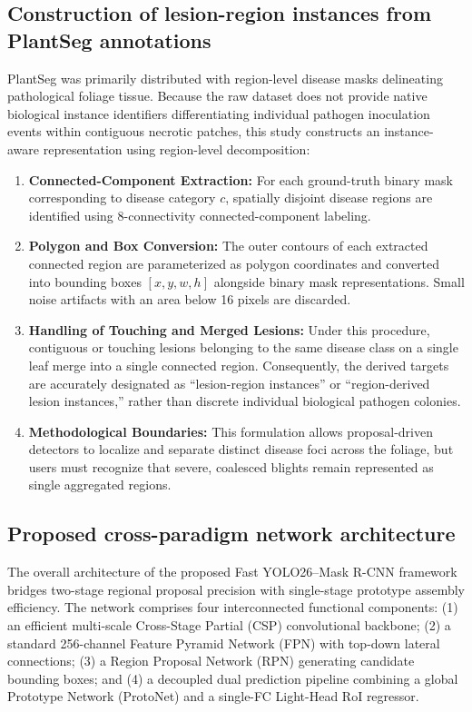 \documentclass[5p,times]{elsarticle}
\begin{document}
\subsection{Construction of lesion-region instances from PlantSeg annotations}
PlantSeg was primarily distributed with region-level disease masks delineating pathological foliage tissue. Because the raw dataset does not provide native biological instance identifiers differentiating individual pathogen inoculation events within contiguous necrotic patches, this study constructs an instance-aware representation using region-level decomposition:
\begin{enumerate}
    \item \textbf{Connected-Component Extraction:} For each ground-truth binary mask corresponding to disease category $c$, spatially disjoint disease regions are identified using 8-connectivity connected-component labeling.
    \item \textbf{Polygon and Box Conversion:} The outer contours of each extracted connected region are parameterized as polygon coordinates and converted into bounding boxes $[x, y, w, h]$ alongside binary mask representations. Small noise artifacts with an area below 16 pixels are discarded.
    \item \textbf{Handling of Touching and Merged Lesions:} Under this procedure, contiguous or touching lesions belonging to the same disease class on a single leaf merge into a single connected region. Consequently, the derived targets are accurately designated as ``lesion-region instances'' or ``region-derived lesion instances,'' rather than discrete individual biological pathogen colonies.
    \item \textbf{Methodological Boundaries:} This formulation allows proposal-driven detectors to localize and separate distinct disease foci across the foliage, but users must recognize that severe, coalesced blights remain represented as single aggregated regions.
\end{enumerate}

\subsection{Proposed cross-paradigm network architecture}
The overall architecture of the proposed Fast YOLO26--Mask R-CNN framework bridges two-stage regional proposal precision with single-stage prototype assembly efficiency. The network comprises four interconnected functional components: (1) an efficient multi-scale Cross-Stage Partial (CSP) convolutional backbone; (2) a standard 256-channel Feature Pyramid Network (FPN) with top-down lateral connections; (3) a Region Proposal Network (RPN) generating candidate bounding boxes; and (4) a decoupled dual prediction pipeline combining a global Prototype Network (ProtoNet) and a single-FC Light-Head RoI regressor.
\end{document}
